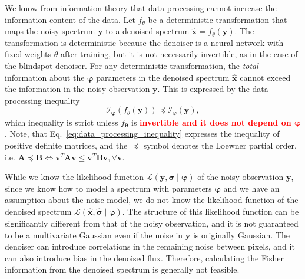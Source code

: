 \documentclass[twocolumn]{aastex7}
\newcommand{\ld}[1]{\textcolor{red}{\textbf{#1}}}
\newcommand{\m}[1]{\boldsymbol{#1}}
\begin{document}
We know from information theory that data processing cannot increase the information content of the data. Let $f_\theta$ be a deterministic transformation  that maps the noisy spectrum $\m{y}$ to a denoised spectrum $\hat{\m{x}} = f_\theta(\m{y})$. The transformation is deterministic because the denoiser is a neural network with fixed weights $\theta$ after training, but it is not necessarily invertible, as in the case of the blindspot denoiser. For any deterministic transformation, the \textit{total} information about the $\m{\varphi}$ parameters in the denoised spectrum $\hat{\m{x}}$ cannot exceed the information in the noisy observation $\m{y}$. This is expressed by the data processing inequality
\begin{equation}
    \mathcal{I}_{\m{\varphi}}(f_\theta(\m{y}))
        \preceq \mathcal{I}_{\varphi}(\m{y}),
    \label{eq:data_processing_inequality}
\end{equation}
which inequality is strict unless $f_{\m{\theta}}$ is \ld{invertible and it does not depend on $\m{\varphi}$}. Note, that Eq.~\ref{eq:data_processing_inequality} expresses the inequality of positive definite matrices, and the $\preceq$ symbol denotes the Loewner partial order, i.e.
$
    \m{A} \preceq \m{B} \Leftrightarrow \m{v}^T \m{A} \m{v} \leq \m{v}^T \m{B} \m{v}, \forall \m{v}.
$

While we know the likelihood function $\mathcal{L}(\m{y},\m{\sigma}\mid\m{\varphi})$ of the noisy observation $\m{y}$, since we know how to model a spectrum with parameters $\m{\varphi}$ and we have an assumption about the noise model, we do not know the likelihood function of the denoised spectrum $\mathcal{L}(\hat{\m{x}},\hat{\m{\sigma}}\mid\m{\varphi})$. The structure of this likelihood function can be significantly different from that of the noisy observation, and it is not guaranteed to be a multivariate Gaussian even if the noise in $\m{y}$ is originally Gaussian. The denoiser can introduce correlations in the remaining noise between pixels, and it can also introduce bias in the denoised flux. Therefore, calculating the Fisher information from the denoised spectrum is generally not feasible.
\end{document}
